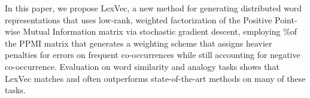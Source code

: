 In this paper, we propose LexVec, a new method for generating distributed word representations that uses low-rank, weighted factorization of the Positive Point-wise Mutual Information matrix via stochastic gradient descent, employing \%of the PPMI matrix that generates a weighting scheme that assigns heavier penalties for errors on frequent co-occurrences while still accounting for negative co-occurrence. Evaluation on word similarity and analogy tasks shows that LexVec matches and often outperforms state-of-the-art methods on many of these tasks.
